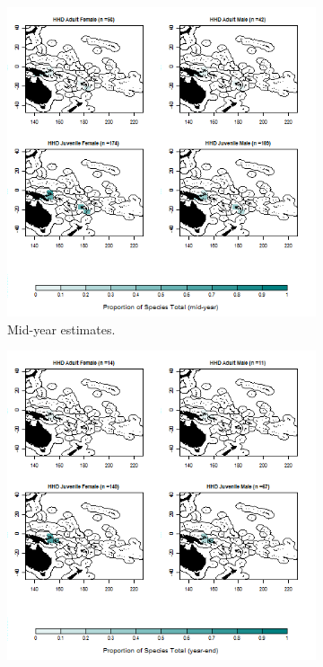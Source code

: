 \documentclass[12pt]{SCreport}
\begin{document}
\begin{landscape}
\begin{figure}
\centering
   \begin{subfigure}[b]{0.6\textwidth}
       \includegraphics[width=\textwidth]{../GRAPHICS/Defined/BI_24_Map_maturity_sex_HHD_MY}
       \caption{Mid-year estimates.}
       \label{fig:test1}
   \end{subfigure}
   \begin{subfigure}[b]{0.6\textwidth}
       \includegraphics[width=\textwidth]{../GRAPHICS/Defined/BI_23_Map_maturity_sex_HHD}

\end{subfigure}
\end{figure}
\end{landscape}
\end{document}
